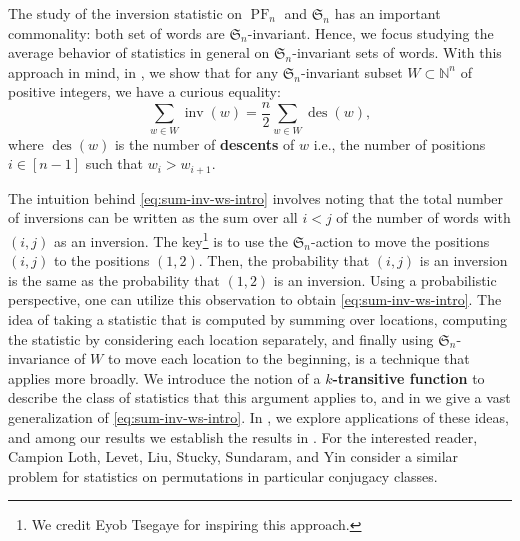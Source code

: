 \documentclass{amsart}
\newcommand{\N}{\mathbb{N}}
\renewcommand{\S}{\mathfrak{S}}
\DeclareMathOperator{\des}{des}
\DeclareMathOperator{\inv}{inv}
\DeclareMathOperator{\PF}{PF}
\newcommand{\defterm}{\textbf}
\theoremstyle{definition}
\begin{document}
The study of the inversion statistic on $\PF_n$ and $\S_n$ has an important commonality: both set of words are $\S_n$-invariant. 
Hence, we focus studying the average behavior of  statistics in general on $\S_n$-invariant sets of words. 
With this approach in mind, in , we show that for any  $\S_n$-invariant subset $W\subset \N^n$ of positive integers, we have a curious equality: 
\begin{equation}\label{eq:sum-inv-ws-intro}\sum_{w\in W}\inv(w)=\frac{n}{2}\sum_{w\in W}\des(w),\end{equation}
where $\des(w)$ is the number of \defterm{descents} of $w$ i.e., the number of positions $i\in [n-1]$ such that $w_i>w_{i+1}$.

The intuition behind \eqref{eq:sum-inv-ws-intro} involves noting that the total number of inversions can be written as
the sum over all $i<j$ of the number of words with $(i,j)$ as an inversion.
The key\footnote{We credit Eyob Tsegaye for inspiring this approach.} is to use the $\S_n$-action to move the positions $(i,j)$ to the positions $(1,2)$. Then, the probability that $(i,j)$ is an inversion is the same as the probability that $(1,2)$ is an inversion. 
Using a probabilistic perspective, one can utilize this observation to obtain \eqref{eq:sum-inv-ws-intro}. 
The idea of taking a statistic that is computed by summing over locations, computing the statistic by considering each location separately, and finally using $\S_n$-invariance of $W$ to move each location to the beginning, is a technique that applies more broadly.  We introduce the notion of a \defterm{$k$-transitive function} to describe the class of statistics that this argument applies to, and in  we give a vast generalization of \eqref{eq:sum-inv-ws-intro}. 
In , we explore applications of these ideas, and among our results we establish the results in . 
For the interested reader, Campion Loth, Levet, Liu, Stucky, Sundaram, and Yin \cite{LLLSSY23} consider a similar problem for statistics on permutations in particular conjugacy classes. 
\end{document}
